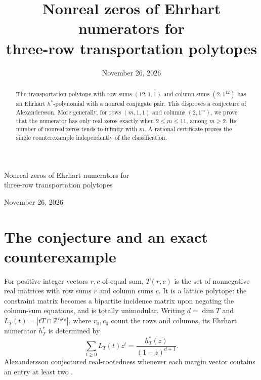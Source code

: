 \documentclass[11pt]{article}
\title{Nonreal zeros of Ehrhart numerators for\\three-row transportation polytopes}
\author{}
\date{November 26, 2026}
\newcommand{\Z}{\mathbb Z}
\begin{document}
\begin{center}
{\LARGE Nonreal zeros of Ehrhart numerators for\\[2pt]three-row transportation polytopes\par}
\medskip November 26, 2026
\end{center}
\begin{abstract}
The transportation polytope with row sums $(12,1,1)$ and column sums $(2,1^{12})$ has an Ehrhart $h^*$-polynomial with a nonreal conjugate pair. This disproves a conjecture of Alexandersson. More generally, for rows $(m,1,1)$ and columns $(2,1^m)$, we prove that the numerator has only real zeros exactly when $2\le m\le11$, among $m\ge2$. Its number of nonreal zeros tends to infinity with $m$. A rational certificate proves the single counterexample independently of the classification.
\end{abstract}

\section{The conjecture and an exact counterexample}
For positive integer vectors $r,c$ of equal sum, $T(r,c)$ is the set of nonnegative real matrices with row sums $r$ and column sums $c$. It is a lattice polytope: the constraint matrix becomes a bipartite incidence matrix upon negating the column-sum equations, and is totally unimodular. Writing $d=\dim T$ and $L_T(t)=|tT\cap\Z^{r_0c_0}|$, where $r_0,c_0$ count the rows and columns, its Ehrhart numerator $h^*_T$ is determined by
\[
  \sum_{t\ge0}L_T(t)z^t=\frac{h^*_T(z)}{(1-z)^{d+1}}.
\]
Alexandersson conjectured real-rootedness whenever each margin vector contains an entry at least two \cite{symcat}.
\end{document}
